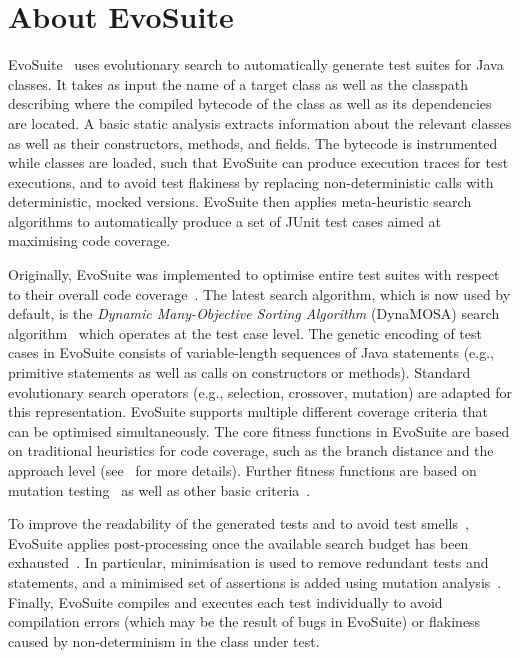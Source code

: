 \documentclass[10pt,conference]{IEEEtran}
\newcommand{\EVOSUITE}{{\sc EvoSuite}\xspace}
\begin{document}
\section{About EvoSuite}


\EVOSUITE~\cite{FrA11c} uses evolutionary search to automatically generate test
suites for Java classes. It takes as input the name of a target class as well
as the classpath describing where the compiled bytecode of the class as well as
its dependencies are located. A basic static analysis extracts information
about the relevant classes as well as their constructors, methods, and fields.
The bytecode is instrumented while classes are loaded, such that \EVOSUITE can
produce execution traces for test executions, and to avoid test flakiness by
replacing non-deterministic calls with deterministic, mocked versions.
\EVOSUITE then applies meta-heuristic search algorithms to automatically
produce a set of JUnit test cases aimed at maximising code coverage.


Originally, \EVOSUITE was implemented to optimise entire test suites with
respect to their overall code coverage~\cite{GoA_TSE12}. The latest search algorithm, which is now used by default, is the \textit{Dynamic Many-Objective Sorting Algorithm} (DynaMOSA) search algorithm~\cite{dynamosa} which operates at the test case level. 
%
The genetic encoding of test cases in \EVOSUITE consists of variable-length sequences of Java statements (e.g., primitive statements as well as calls on constructors or methods). Standard evolutionary search operators (e.g., selection, crossover, mutation) are adapted for this representation. 
%
\EVOSUITE supports multiple different coverage criteria that can be optimised simultaneously. The core fitness functions in \EVOSUITE are based on traditional heuristics for code coverage, such as the branch distance and the approach level (see~\cite{GoA_TSE12} for more details). Further fitness functions are based on mutation testing~\cite{emse14_mutation} as well as other basic criteria~\cite{rojas2015combining}.


To improve the readability of the generated tests and to avoid test smells~\cite{panichella2020revisiting}, \EVOSUITE applies post-processing once the available search budget has been exhausted~\cite{FrA11c,FrA13a}. In particular, minimisation is used to remove redundant tests and statements, and a minimised set of assertions is added using mutation analysis~\cite{10.1109/TSE.2011.93}. Finally, \EVOSUITE compiles and executes each test individually to avoid compilation errors (which may be the result of bugs in \EVOSUITE) or flakiness caused by non-determinism in the class under test.
\end{document}
